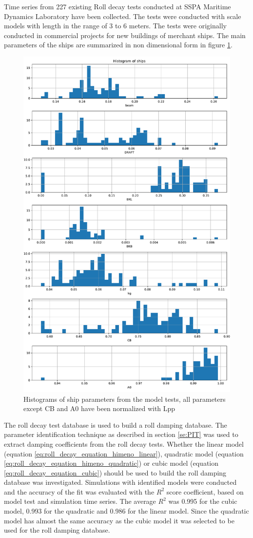 
Time series from 227 existing Roll decay tests conducted at SSPA Maritime Dynamics Laboratory have been collected. The tests were conducted with scale models with length in the range of 3 to 6 meters. The tests were originally conducted in commercial projects for new buildings of merchant ships. The main parameters of the ships are summarized in non dimensional form in figure \ref{fig:ship_parameters}. 

\begin{figure}[H]
    \centering
    \includegraphics[width=0.8\columnwidth]{figures/ship_parameters.pdf}
    \caption{Histograms of ship parameters from the model tests, all parameters except CB and A0 have been normalized with Lpp}
    \label{fig:ship_parameters}
\end{figure}

The roll decay test database is used to build a roll damping database. The parameter identification technique as described in section \ref{se:PIT} was used to extract damping coefficients from the roll decay tests. Whether the linear model (equation \ref{eq:roll_decay_equation_himeno_linear}), quadratic model (equation \ref{eq:roll_decay_equation_himeno_quadratic}) or cubic model (equation \ref{eq:roll_decay_equation_cubic}) should be used to build the roll damping database was investigated. Simulations with identified models were conducted and the accuracy of the fit was evaluated with the $R^2$ score coefficient, based on model test and simulation time series.
The average $R^2$ was 0.995 for the cubic model, 0.993 for the quadratic and 0.986 for the linear model. Since the quadratic model has almost the same accuracy as the cubic model it was selected to be used for the roll damping database.
